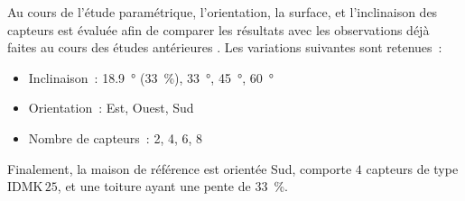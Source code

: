 
Au cours de l’étude paramétrique, l’orientation, la surface, et l’inclinaison
des capteurs est évaluée afin de comparer les résultats avec les observations déjà
faites au cours des études antérieures \parencite{Task26C2007,Shariah2002587}.
Les variations suivantes sont retenues~:
\begin{itemize}
  \item Inclinaison~: \SI{18.9}{\degree} (\SI{33}{\percent}), \SI{33}{\degree}, \SI{45}{\degree}, \SI{60}{\degree}
  \item Orientation~: Est, Ouest, Sud
  \item Nombre de capteurs~: \num{2}, \num{4}, \num{6}, \num{8}
\end{itemize}
Finalement, la maison de référence est orientée Sud, comporte $4$ capteurs
de type IDMK\,$25$, et une toiture ayant une pente de \SI{33}{\percent}.



